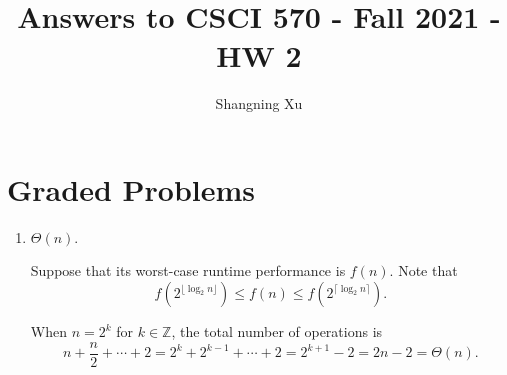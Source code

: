 \documentclass{article}
\title{Answers to CSCI 570 - Fall 2021 - HW 2}
\author{Shangning Xu}
\begin{document}
\maketitle

\section{Graded Problems}

\begin{enumerate}
	\item $\Theta(n)$.
	
	Suppose that its worst-case runtime performance is $f(n)$. Note that
	\[
		f(2^{\lfloor\log_2 n\rfloor}) \le f(n) \le f(2^{\lceil\log_2 n\rceil}).
	\]
	
	When $n = 2^k$ for $k \in \mathbb{Z}$, the total number of operations is
	\[
		n + \frac{n}{2} + \cdots + 2 = 2^k + 2^{k - 1} + \cdots + 2 = 2^{k + 1} - 2 = 2n - 2 = \Theta(n).
	\]
	

\end{enumerate}
\end{document}
